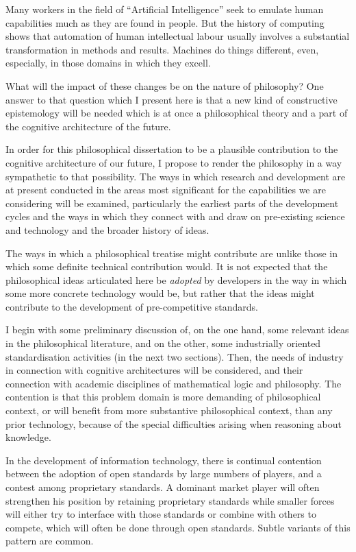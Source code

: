 Many workers in the field of ``Artificial Intelligence'' seek to emulate
human capabilities much as they are found in people.
But the history of computing shows that automation of human intellectual labour
usually involves a substantial transformation in methods and results.
Machines do things different, even, especially, in those domains in which they
excell.

What will the impact of these changes be on the nature of philosophy?
One answer to that question which I present here is that a new kind of
constructive epistemology will be needed which is at once a philosophical
theory and a part of the cognitive architecture of the future.

In order for this philosophical dissertation to be a plausible contribution
to the cognitive architecture of our future, I propose to render the philosophy
in a way sympathetic to that possibility.
The ways in which research and development are at present conducted in the
areas most significant for the capabilities we are considering will be examined,
particularly the earliest parts of the development cycles and the ways in which
they connect with and draw on pre-existing science and technology and the
broader history of ideas.

The ways in which a philosophical treatise might contribute are unlike those in
which some definite technical contribution would.
It is not expected that the philosophical ideas articulated here be {\it adopted} by developers
in the way in which some more concrete technology would be, but rather that
the ideas might contribute to the development of pre-competitive standards.

I begin with some preliminary discussion of, on the one hand, some relevant
ideas in the philosophical literature, and on the other, some industrially
oriented standardisation activities (in the next two sections).
Then, the needs of industry in connection with cognitive architectures will
be considered, and their connection with academic disciplines of mathematical
logic and philosophy.
The contention is that this problem domain is more demanding of philosophical
context, or will benefit from more substantive philosophical context, than any
 prior technology, because of the special difficulties arising when reasoning
about knowledge.

In the development of information technology, there is continual contention between
the adoption of open standards by large numbers of players, and a contest among
proprietary standards.
A dominant market player will often strengthen his position by retaining proprietary
standards while smaller forces will either try to interface with those standards
or combine with others to compete, which will often be done through open standards.
Subtle variants of this pattern are common.

